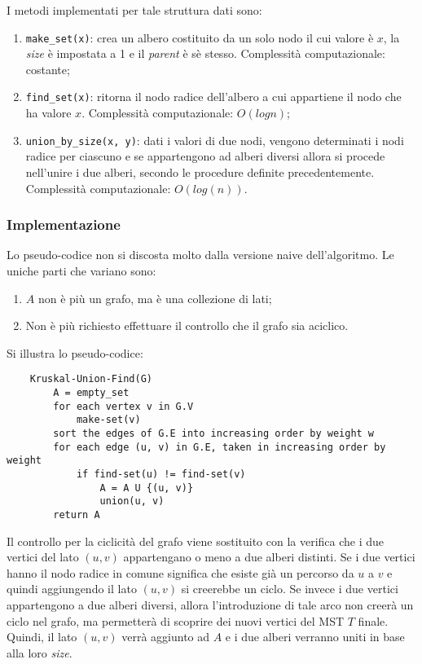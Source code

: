 I metodi implementati per tale struttura dati sono:
\begin{enumerate}
    \item \verb|make_set(x)|: crea un albero costituito da un solo nodo
    il cui valore è $x$, la \textit{size} è impostata a 1 e il
    \textit{parent} è sè stesso. Complessità computazionale: costante;
    \item \verb|find_set(x)|: ritorna il nodo radice dell'albero a cui
    appartiene il nodo che ha valore $x$. Complessità computazionale:
    $O(log n)$;
    \item \verb|union_by_size(x, y)|: dati i valori di due nodi, vengono
    determinati i nodi radice per ciascuno e se appartengono ad alberi diversi
    allora si procede nell'unire i due alberi, secondo le procedure definite
    precedentemente. Complessità computazionale: $O(log(n))$.
\end{enumerate}

\subsubsection{Implementazione}

Lo pseudo-codice non si discosta molto dalla versione naive dell'algoritmo.
Le uniche parti che variano sono:
\begin{enumerate}
    \item $A$ non è più un grafo, ma è una collezione di lati;
    \item Non è più richiesto effettuare il controllo che il grafo sia
    aciclico.
\end{enumerate}

Si illustra lo pseudo-codice:
\begin{verbatim}
    Kruskal-Union-Find(G)
        A = empty_set
        for each vertex v in G.V
            make-set(v)
        sort the edges of G.E into increasing order by weight w
        for each edge (u, v) in G.E, taken in increasing order by weight
            if find-set(u) != find-set(v)
                A = A U {(u, v)}
                union(u, v)
        return A
\end{verbatim}

Il controllo per la ciclicità del grafo viene sostituito con la verifica
che i due vertici del lato $(u, v)$ appartengano o meno a due alberi
distinti. Se i due vertici hanno il nodo radice in comune significa che
esiste già un percorso da $u$ a $v$ e quindi aggiungendo il lato $(u, v)$
si creerebbe un ciclo. Se invece i due vertici appartengono a due
alberi diversi, allora l'introduzione di tale arco non creerà un
ciclo nel grafo, ma permetterà di scoprire dei nuovi vertici del MST
$T$ finale. Quindi, il lato $(u, v)$ verrà aggiunto ad $A$ e i due
alberi verranno uniti in base alla loro \textit{size}.

